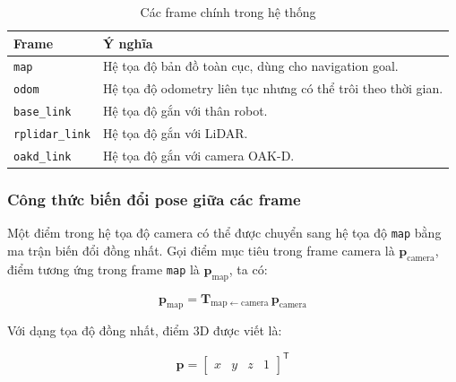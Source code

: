 \begin{table}[H]
    \centering
    \caption{Các frame chính trong hệ thống}
    \label{tab:tf-frames}
    \renewcommand{\arraystretch}{1.25}
    \small
    \begin{tabularx}{\textwidth}{|>{\raggedright\arraybackslash}p{}|>{\raggedright\arraybackslash}X|}
        \hline
        \textbf{Frame} & \textbf{Ý nghĩa} \\
        \hline
        \texttt{map} & Hệ tọa độ bản đồ toàn cục, dùng cho navigation goal. \\
        \hline
        \texttt{odom} & Hệ tọa độ odometry liên tục nhưng có thể trôi theo thời gian. \\
        \hline
        \texttt{base\_link} & Hệ tọa độ gắn với thân robot. \\
        \hline
        \texttt{rplidar\_link} & Hệ tọa độ gắn với LiDAR. \\
        \hline
        \texttt{oakd\_link} & Hệ tọa độ gắn với camera OAK-D. \\
        \hline
    \end{tabularx}
\end{table}

\subsubsection{Công thức biến đổi pose giữa các frame}
\label{subsubsec:tf-transform}

Một điểm trong hệ tọa độ camera có thể được chuyển sang hệ tọa độ \texttt{map} bằng ma trận biến đổi đồng nhất. Gọi điểm mục tiêu trong frame camera là $\mathbf{p}_{\mathrm{camera}}$, điểm tương ứng trong frame \texttt{map} là $\mathbf{p}_{\mathrm{map}}$, ta có:

\begin{equation}
    \mathbf{p}_{\mathrm{map}}
    =
    \mathbf{T}_{\mathrm{map}\leftarrow\mathrm{camera}}\,
    \mathbf{p}_{\mathrm{camera}}
    \label{eq:camera-to-map-transform}
\end{equation}

Với dạng tọa độ đồng nhất, điểm 3D được viết là:

\begin{equation}
    \mathbf{p}
    =
    \begin{bmatrix}
        x & y & z & 1
    \end{bmatrix}^{\mathsf{T}}
    \label{eq:homogeneous-point}
\end{equation}


